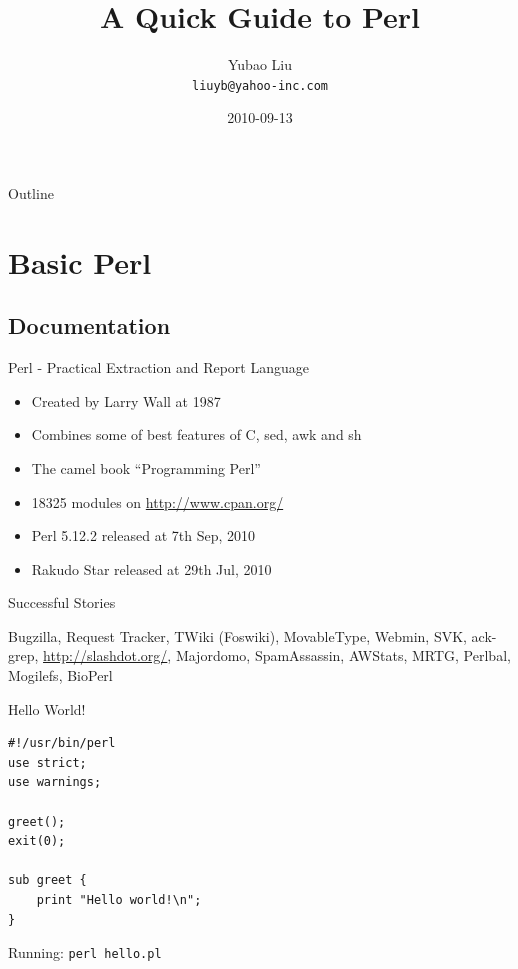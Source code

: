 \documentclass{beamer}
\title{A Quick Guide to Perl}
\author{Yubao Liu \\ \texttt{liuyb@yahoo-inc.com}}
\institute{Yahoo! Global R \& D Center, Beijing}
\date{2010-09-13}
\begin{document}
\begin{frame}
  \titlepage
\end{frame}

\begin{frame}{Outline}
  \tableofcontents
\end{frame}


\section{Basic Perl}
\subsection{Documentation}

\begin{frame}{Perl - Practical Extraction and Report Language}
  \begin{itemize}
    \item Created by Larry Wall at 1987
    \item Combines some of best features of C, sed, awk and sh
    \item The camel book ``Programming Perl''
    \item 18325 modules on \url{http://www.cpan.org/}
    \item Perl 5.12.2 released at 7th Sep, 2010
    \item Rakudo Star released at 29th Jul, 2010
  \end{itemize}
\end{frame}

\begin{frame}{Successful Stories}
    \begin{center}
    Bugzilla, Request Tracker,
    TWiki (Foswiki),
    MovableType,
    Webmin,
    SVK,
    ack-grep,
    \url{http://slashdot.org/},
    Majordomo, SpamAssassin,
    AWStats, MRTG,
    Perlbal, Mogilefs,
    BioPerl
  \end{center}
\end{frame}

\begin{frame}[containsverbatim]{Hello World!}
\begin{lstlisting}[caption=Greeting from Perl]
#!/usr/bin/perl
use strict;
use warnings;

greet();
exit(0);

sub greet {
    print "Hello world!\n";
}
\end{lstlisting}

Running: \texttt{perl hello.pl}
\end{frame}
\end{document}
